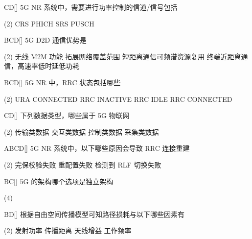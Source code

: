 \begin{choice}{\;CD\;}[]
    5G NR 系统中，需要进行功率控制的信道/信号包括
    \begin{tasks}(2)
        \task CRS
        \task PHICH
        \task SRS
        \task PUSCH
    \end{tasks}
\end{choice}


\begin{choice}{\;BCD\;}[]
    5G D2D 通信优势是
    \begin{tasks}(2)
        \task 无线 M2M 功能
        \task 拓展网络覆盖范围
        \task 短距离通信可频谱资源复用
        \task 终端近距离通信，高速率低时延低功耗
    \end{tasks}
\end{choice}


\begin{choice}{\;BCD\;}[]
    5G NR 中，RRC 状态包括哪些
    \begin{tasks}(2)
        \task URA CONNECTED
        \task RRC INACTIVE
        \task RRC IDLE
        \task RRC CONNECTED
    \end{tasks}
\end{choice}


\begin{choice}{\;CD\;}[]
    下列数据类型，哪些属于 5G 物联网
    \begin{tasks}(2)
        \task 传输类数据
        \task 交互类数据
        \task 控制类数据
        \task 采集类数据
    \end{tasks}
\end{choice}

\begin{choice}{\;ABCD\;}[]
    5G NR 系统中，以下哪些原因会导致 RRC 连接重建
    \begin{tasks}(2)
        \task 完保校验失败
        \task 重配置失败
        \task 检测到 RLF
        \task 切换失败
    \end{tasks}
\end{choice}

\begin{choice}{\;BC\;}[]
    5G 的架构哪个选项是独立架构
    \begin{tasks}(4)
    \end{tasks}
\end{choice}

\begin{choice}{\;BD\;}[]
    根据自由空间传播模型可知路径损耗与以下哪些因素有
    \begin{tasks}(2)
        \task 发射功率
        \task 传播距离
        \task 天线增益
        \task 工作频率
    \end{tasks}
\end{choice}

